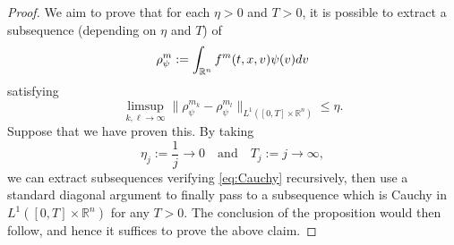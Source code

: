 \documentclass{amsart}
\theoremstyle{plain}
\theoremstyle{remark}
\numberwithin{equation}{section}
\newcommand{\R}{\mathbb{R}}
\newcommand{\dv}{\textnormal{d}v}
\begin{document}
\begin{proof}
We aim to prove that for each $\eta>0$ and $T>0$, it is possible to extract a subsequence (depending on $\eta$ and $T$) of
\[
\rho_{\psi}^m := \int_{\R^n} f^m(t,x,v) \psi(v) \dv
\]
satisfying
\begin{equation}\label{eq:Cauchy}
\limsup_{k,\ell \to \infty} \|\rho_{\psi}^{m_k} - \rho_{\psi}^{m_l}\|_{L^1([0,T]\times \R^n)} \le \eta.
\end{equation}
Suppose that we have proven this. By taking 
\[
\eta_j := \frac{1}{j} \to 0 \quad \text{and} \quad T_j:=j \to \infty,
\]
we can extract subsequences verifying \eqref{eq:Cauchy} recursively, then use a standard diagonal argument to finally pass to a subsequence which is Cauchy in $L^1([0,T]\times \R^n)$ for any $T>0$. The conclusion of the proposition would then follow, and hence it suffices to prove the above claim.


\end{proof}
\end{document}
